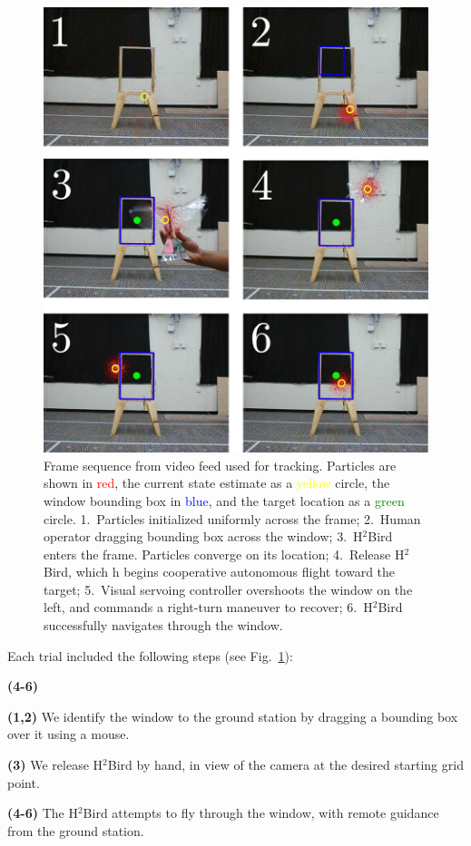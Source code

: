 \documentclass{aamas2013}
\newenvironment{spaced_description}[1]
  {\begin{list}{}%
   {\renewcommand\makelabel[1]{##1:\hfill}%
   \settowidth\labelwidth{\makelabel{#1}}%
   \setlength\leftmargin{\labelwidth}
   \addtolength\leftmargin{\labelsep}}}
  {\end{list}}
\begin{document}
\begin{figure}[tb]
\centering
\includegraphics[width=\linewidth]{figures/pf_screencap.pdf}
\caption{Frame sequence from video feed used for tracking. Particles 
are shown in \textcolor{red}{red}, the current state estimate as a 
\textcolor{yellow}{yellow} circle, the window bounding box in
\textcolor{blue}{blue}, and the target location as a \textcolor{green}{green} 
circle. 1.~Particles initialized uniformly across the frame; 2.~Human operator 
dragging bounding box across the window; 3.~H$^2$Bird enters the frame. 
Particles converge on its location; 4.~Release H$^2$Bird, which h
begins cooperative autonomous flight toward the target; 5.~Visual servoing 
controller overshoots the window on the left, and commands a right-turn 
maneuver to recover; 6.~H$^2$Bird successfully navigates through the window.}
\label{fig:pf_screencap}
\end{figure}

Each trial included the following steps (see Fig.~\ref{fig:pf_screencap}):
\begin{spaced_description}{\textbf{(4-6)}}
\item[\textbf{(1,2)}] We identify the window to the ground station by dragging a bounding 
box over it using a mouse. 
\item[\textbf{(3)}] We release H$^2$Bird by hand, in view of the camera at the desired 
starting grid point.
\item[\textbf{(4-6)}] The H$^2$Bird attempts to fly through the window, with remote 
guidance from the ground station.
\end{spaced_description}
\end{document}
